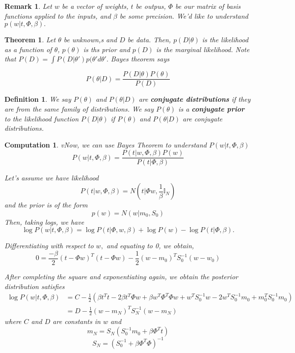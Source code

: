 \documentclass{amsart}
\newtheorem{comp}[subsubsection]{Computation}
\newtheorem{thm}[subsubsection]{Theorem}
\newtheorem{defn}[subsubsection]{Definition}
\newtheorem{rem}[subsubsection]{Remark}
\begin{document}
\begin{rem}
Let $w$ be a vector of weights, $t$ be outpus, $\Phi$ be our matrix of basis functions applied to the inputs, and $\beta$ be some precision.  We'd like to understand $p(w|t,\Phi,\beta).$
\end{rem}

\begin{thm}
Let $\theta$ be unknown,s and $D$ be data. Then,
$p(D|\theta)$ is the likelihood as a function of $\theta$, $p(\theta)$ is ths prior and $p(D)$ is the marginal likelihood. Note that $P(D) = \int P(D|\theta')p(\theta'd\theta'.$ Bayes theorem says

$$P(\theta|D) = \frac{P(D|\theta) P(\theta)}{P(D)}$$
\end{thm}

\begin{defn}
We say $P(\theta)$ and $P(\theta | D)$ are {\bf conjugate distributions} if they are from the same family of distributions. We say $P(\theta)$ is a {\bf conjugate prior} to the likelihood function $P(D|\theta)$ if $P(\theta)$ and $P(\theta|D)$ are conjugate distributions.
\end{defn}

\begin{comp}
vNow, we can use Bayes Theorem to understand $P(w|t,\Phi,\beta)$
$$P(w|t,\Phi,\beta) = \frac{P(t|w,\Phi,\beta)P(w)}{P(t|\Phi,\beta)}$$

Let's assume we have likelihood $$P(t|w,\Phi, \beta) = N(t|\Phi w, \frac 1 \beta \mathbb I_N)$$
and the prior is of the form
$$p(w) = N(w|m_0,S_0)$$
Then, taking logs, we have
$$\log P(w|t,\Phi,\beta) = \log P(t|\Phi,w,\beta)+\log P(w) - \log P(t|\Phi,\beta).$$

Differentiating with respect to $w,$ and equating to 0, we obtain,
$$0=\frac {-\beta} 2 (t - \Phi w)^T(t - \Phi w) - \frac 1 2 (w - m_0)^T S_0^{-1} (w-w_0)$$

After completing the square and exponentiating again, we obtain the posterior distribution satisfies
\begin{align*}
\log P(w|t,\Phi,\beta) &= C - \frac 1 2 \left( \beta t^T t - 2 \beta t^T\Phi w + \beta w^T\Phi^T \Phi w + w^T S_0^{-1}w - 2 w^T S_0^{-1}m_0 + m_0^TS_0^{-1}m_0\right)
\\
&= D - \frac 1 2 (w-m_N)^T S_N^{-1}(w - m_N)
\end{align*}
where $C$ and $D$ are constants in $w$ and
$$m_N = S_N(S_0^{-1}m_0 + \beta \Phi^T t)$$
$$S_N = (S_0^{-1} + \beta \Phi^T\Phi)^{-1}$$
\end{comp}
\end{document}
